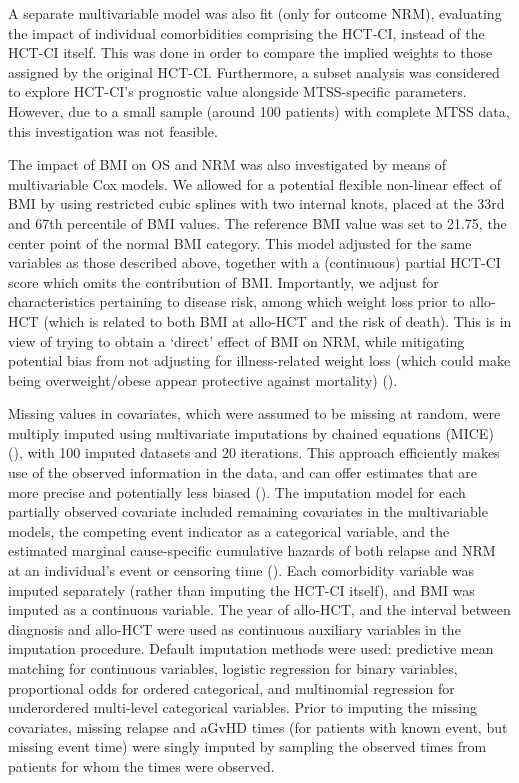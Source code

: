 \documentclass[
  letterpaper,
  DIV=11,
  numbers=noendperiod]{scrreprt}
\begin{document}
A separate multivariable model was also fit (only for outcome NRM),
evaluating the impact of individual comorbidities comprising the HCT-CI,
instead of the HCT-CI itself. This was done in order to compare the
implied weights to those assigned by the original HCT-CI. Furthermore, a
subset analysis was considered to explore HCT-CI's prognostic value
alongside MTSS-specific parameters. However, due to a small sample
(around 100 patients) with complete MTSS data, this investigation was
not feasible.

The impact of BMI on OS and NRM was also investigated by means of
multivariable Cox models. We allowed for a potential flexible non-linear
effect of BMI by using restricted cubic splines with two internal knots,
placed at the 33rd and 67th percentile of BMI values. The reference BMI
value was set to 21.75, the center point of the normal BMI category.
This model adjusted for the same variables as those described above,
together with a (continuous) partial HCT-CI score which omits the
contribution of BMI. Importantly, we adjust for characteristics
pertaining to disease risk, among which weight loss prior to allo-HCT
(which is related to both BMI at allo-HCT and the risk of death). This
is in view of trying to obtain a `direct' effect of BMI on NRM, while
mitigating potential bias from not adjusting for illness-related weight
loss (which could make being overweight/obese appear protective against
mortality) ().

Missing values in covariates, which were assumed to be missing at
random, were multiply imputed using multivariate imputations by chained
equations (MICE)
(), with 100 imputed datasets and 20 iterations. This
approach efficiently makes use of the observed information in the data,
and can offer estimates that are more precise and potentially less
biased (). The imputation model for each partially observed
covariate included remaining covariates in the multivariable models, the
competing event indicator as a categorical variable, and the estimated
marginal cause-specific cumulative hazards of both relapse and NRM at an
individual's event or censoring time
(). Each comorbidity variable was imputed separately
(rather than imputing the HCT-CI itself), and BMI was imputed as a
continuous variable. The year of allo-HCT, and the interval between
diagnosis and allo-HCT were used as continuous auxiliary variables in
the imputation procedure. Default imputation methods were used:
predictive mean matching for continuous variables, logistic regression
for binary variables, proportional odds for ordered categorical, and
multinomial regression for underordered multi-level categorical
variables. Prior to imputing the missing covariates, missing relapse and
aGvHD times (for patients with known event, but missing event time) were
singly imputed by sampling the observed times from patients for whom the
times were observed.
\end{document}
